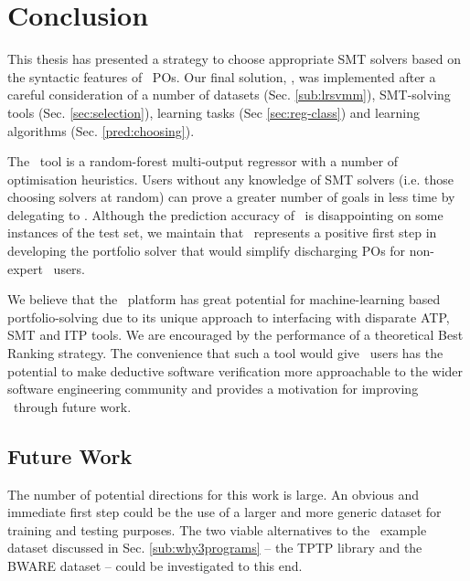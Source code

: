 \chapter{Conclusion}
\thispagestyle{nohead}
\label{Conclusion}

This thesis has presented a strategy to choose appropriate SMT solvers based on the syntactic features of \why~POs.
Our final solution, \where, was implemented after a careful consideration of a number of datasets (Sec. \ref{sub:lrsvmm}), SMT-solving tools (Sec. \ref{sec:selection}), learning tasks (Sec \ref{sec:reg-class}) and learning algorithms (Sec. \ref{pred:choosing}).

The \where~tool is a random-forest multi-output regressor with a number of optimisation heuristics.
Users without any knowledge of SMT solvers (i.e. those choosing solvers at random) can prove a greater number of goals in less time by delegating to \where. 
Although the prediction accuracy of \where~is disappointing on some instances of the test set, we maintain that \where~represents a positive first step in developing the portfolio solver that would simplify discharging POs for non-expert \why~users.


We believe that the \why~platform has great potential for machine-learning based portfolio-solving due to its unique approach to interfacing with disparate ATP, SMT and ITP tools.
We are encouraged by the performance of a theoretical \textsf{Best Ranking} strategy.
The convenience that such a tool would give \why~users has the potential to make deductive software verification more approachable to the wider software engineering community and provides a motivation for improving \where~through future work.

\section{Future Work}
\label{sec:future}

The number of potential directions for this work is large.
An obvious and immediate first step could be the use of a larger and more generic dataset for training and testing purposes.
The two viable alternatives to the \why~example dataset discussed in Sec. \ref{sub:why3programs} -- the TPTP library \cite{TPTP} and the BWARE dataset \cite{Delahaye2014} -- could be investigated to this end.
 
